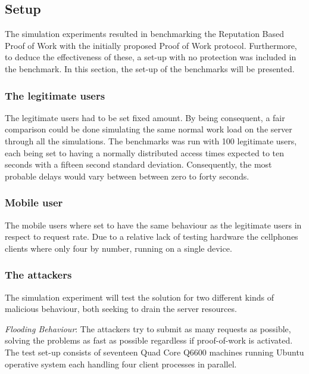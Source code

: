 

\subsection{Setup}
The simulation experiments resulted in benchmarking the Reputation Based Proof of Work with the initially proposed Proof of Work protocol. Furthermore, to deduce the effectiveness of these, a set-up with no protection was included in the benchmark. In this section, the set-up of the benchmarks will be presented.
\label{text:setup}
\subsubsection{The legitimate users} 
The legitimate users had to be set fixed amount. By being consequent, a fair comparison could be done simulating the same normal work load on the server through all the simulations. The benchmarks was run with 100 legitimate users, each being set to having a normally distributed access times expected to ten seconds with a fifteen second standard deviation. Consequently, the most probable delays would vary between between zero to forty seconds.
\\
\subsubsection{Mobile user}
The mobile users where set to have the same behaviour as the legitimate users in respect to request rate. Due to a relative lack of testing hardware the cellphones clients where only four by number, running on a single device. 
\\
\subsubsection{The attackers} 
The simulation experiment will test the solution for two different kinds of malicious behaviour, both seeking to drain the server resources.

\emph{Flooding Behaviour}: The attackers try to submit as many requests as possible, solving the problems as fast as possible regardless if proof-of-work is activated. The test set-up consists of seventeen Quad Core Q6600 machines running Ubuntu operative system each handling four client processes in parallel.

